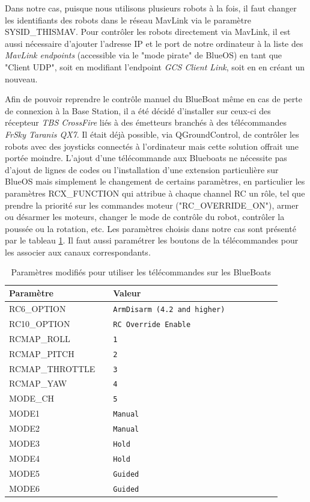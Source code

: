     Dans notre cas, puisque nous utilisons plusieurs robots à la fois, il faut changer les identifiants des robots dans le réseau MavLink via le paramètre SYSID_THISMAV. Pour contrôler les robots directement via MavLink, il est aussi nécessaire d'ajouter l'adresse IP et le port de notre ordinateur à la liste des \textit{MavLink endpoints} (accessible via le "mode pirate" de BlueOS) en tant que "Client UDP", soit en modifiant l'endpoint \textit{GCS Client Link}, soit en en créant un nouveau.

    Afin de pouvoir reprendre le contrôle manuel du BlueBoat même en cas de perte de connexion à la Base Station, il a été décidé d'installer sur ceux-ci des récepteur \textit{TBS CrossFire} liés à des émetteurs branchés à des télécommandes \textit{FrSky Taranis QX7}. Il était déjà possible, via QGroundControl, de contrôler les robots avec des joysticks connectés à l'ordinateur mais cette solution offrait une portée moindre. L'ajout d'une télécommande aux Blueboats ne nécessite pas d'ajout de lignes de codes ou l'installation d'une extension particulière sur BlueOS mais simplement le changement de certains paramètres, en particulier les paramètres RCX_FUNCTION qui attribue à chaque channel RC un rôle, tel que prendre la priorité sur les commandes moteur ("RC_OVERRIDE_ON"), armer ou désarmer les moteurs, changer le mode de contrôle du robot, contrôler la poussée ou la rotation, etc. Les paramètres choisis dans notre cas sont présenté par le tableau \ref{tab:param_telecom}. Il faut aussi paramétrer les boutons de la télécommandes pour les associer aux canaux correspondants.

    \begin{table}[h]
        \centering
        \caption{Paramètres modifiés pour utiliser les télécommandes sur les BlueBoats}
        \label{tab:param_telecom}
        \renewcommand{\arraystretch}{1.2}
        \begin{tabular}{p{0.34\linewidth} p{0.56\linewidth}}
            \toprule
            \textbf{Paramètre} & \textbf{Valeur} \\
            \midrule
            RC6_OPTION & \texttt{ArmDisarm (4.2 and higher)} \\
            RC10_OPTION & \texttt{RC Override Enable} \\
            RCMAP_ROLL & \texttt{1} \\
            RCMAP_PITCH & \texttt{2} \\
            RCMAP_THROTTLE & \texttt{3} \\
            RCMAP_YAW & \texttt{4} \\
            MODE_CH & \texttt{5} \\
            MODE1 & \texttt{Manual} \\
            MODE2 & \texttt{Manual} \\
            MODE3 & \texttt{Hold} \\
            MODE4 & \texttt{Hold} \\
            MODE5 & \texttt{Guided} \\
            MODE6 & \texttt{Guided} \\
            \bottomrule
        \end{tabular}
    \end{table}

